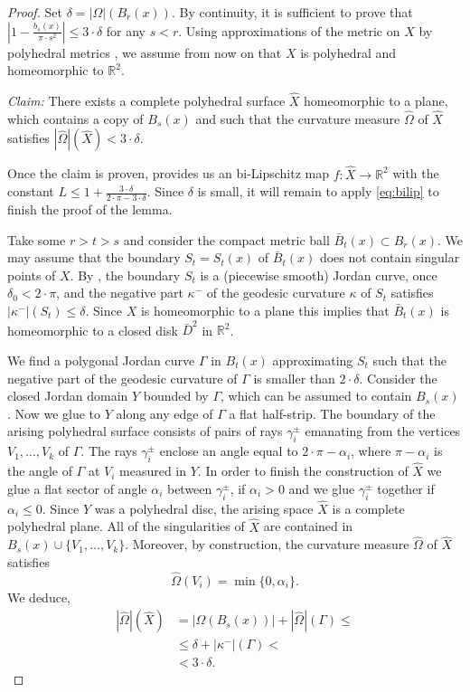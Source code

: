 \documentclass[12pt,leqno,intlimits]{amsart}
\numberwithin{equation}{section}
\theoremstyle{definition}
\theoremstyle{remark}
\newcommand{\R}{\mathbb{R}}
\def\:{\colon}
\begin{document}
\begin{proof}
{\color{red}
Set $\delta = |\Omega |( B_{r} (x))$. By continuity, it is sufficient to prove that $|1- \frac {b_s(x)} {\pi{\cdot}s^2}| \leq 3{\cdot}\delta $ for any $s<r$. Using approximations of
the metric on $X$ by polyhedral metrics \cite[Theorem 8.4.3, Theorem 8.1.9]{Reshetnyak-GeomIV}, we assume from now on that $X$ is polyhedral and homeomorphic to $\R^2$.

\emph{Claim:} There exists a complete polyhedral surface $\hat X$ homeomorphic to a plane, which contains a copy of $B_s (x)$ and such that
the curvature measure $\hat \Omega$ of $\hat X$ satisfies $|\hat \Omega | (\hat X) < 3 \cdot \delta$.

Once the claim is proven,
\cite{Bonk-Lang} provides us an bi-Lipschitz map $f\:\hat X\to \R^2$ with the constant $L\leq 1+\frac {3{\cdot}\delta} {2{\cdot}\pi -3{\cdot}\delta}$.
Since $\delta$ is small, it will remain to apply \eqref{eq:bilip} to finish the proof of the lemma.



Take some $r>t>s$ and consider the compact metric ball $\bar B_t (x) \subset B_r (x)$.
We may assume that the boundary $S_t=S_t (x)$ of
$\bar B_t (x)$ does not contain singular points of $X$. 
By \cite[Theorem 9.1, Theorem 9.3] {Reshetnyak-GeomIV}, the boundary $S_t$ is a (piecewise smooth) Jordan curve, once $\delta _0< 2{\cdot}\pi$, and the negative part $\kappa ^-$ of the geodesic curvature $\kappa$ of $S_t$ satisfies $|\kappa ^-| (S_t) \leq \delta$. 
Since $X$ is homeomorphic to a plane this implies that $\bar B_t (x)$ is homeomorphic to a closed disk $\bar D^2$ in $\R^2$.

}

We find a polygonal Jordan curve $\Gamma$ in $B_t(x)$ approximating $S_t$ such that the negative part of the geodesic curvature of $\Gamma$ is smaller than $2{\cdot}\delta$. Consider the closed Jordan domain $Y$ bounded by $\Gamma$, which can be assumed to contain $B_s(x)$.
Now we glue to $Y$ along any edge of $\Gamma$ a flat half-strip.
The boundary of the arising polyhedral surface consists of pairs of rays
$\gamma _i ^{\pm}$ emanating from the vertices $V_1,\dots,V_k$ of $\Gamma$. The rays $\gamma _i^{\pm}$ enclose an angle equal to $2{\cdot}\pi- \alpha _i$, where $\pi-\alpha _i$ is the angle of $\Gamma$ at $V_i$ measured in $Y$. In order to finish the construction of $\hat X$ we glue a flat sector of
angle $\alpha _i$ between $\gamma _i ^{\pm}$, if $\alpha _i >0$ and we glue $\gamma _i^{\pm}$ together if $\alpha _i \leq 0$.
Since $Y$ was a polyhedral disc, the arising space $\hat X$ is a complete polyhedral plane.
All of the singularities of $\hat X$ are contained in $B_s(x) \cup \{ V_1,\dots, V_k\}$. Moreover, by construction, the curvature measure
$\hat \Omega$ of $\hat X$ satisfies
$$\hat \Omega (V_i) = \min \{ 0, \alpha _i \}.$$
We deduce,
\begin{align*}
|\hat \Omega | ( \hat X) &= |\Omega (B_s (x))| + |\hat \Omega | ( \Gamma ) \leq
\\
&\leq \delta + |\kappa ^-| (\Gamma ) <
\\
&< 3{\cdot}\delta.
\end{align*}



\end{proof}
\end{document}
